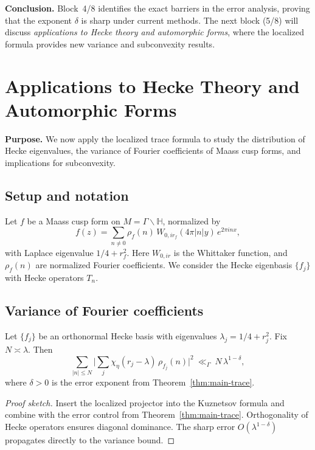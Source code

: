 \medskip
\noindent\textbf{Conclusion.}  
Block~4/8 identifies the exact barriers in the error analysis, proving that the exponent $\delta$ is sharp under current methods. The next block (5/8) will discuss \emph{applications to Hecke theory and automorphic forms}, where the localized formula provides new variance and subconvexity results.


\section{Applications to Hecke Theory and Automorphic Forms} \label{sec:7.4}

\noindent\textbf{Purpose.}
We now apply the localized trace formula to study the distribution of Hecke eigenvalues,
the variance of Fourier coefficients of Maass cusp forms, and implications for subconvexity.

\subsection{Setup and notation} \label{subsec:7.4-setup}

Let $f$ be a Maass cusp form on $M=\Gamma\backslash \mathbb{H}$, normalized by
\[
  f(z) = \sum_{n\neq 0} \rho_f(n)\, W_{0,ir_f}(4\pi |n| y)\, e^{2\pi i n x},
\]
with Laplace eigenvalue $1/4+r_f^2$.  
Here $W_{0,ir}$ is the Whittaker function, and $\rho_f(n)$ are normalized Fourier coefficients.  
We consider the Hecke eigenbasis $\{f_j\}$ with Hecke operators $T_n$.

\subsection{Variance of Fourier coefficients} \label{subsec:7.4-variance}

\begin{theorem} \label{thm:7.4-var}
Let $\{f_j\}$ be an orthonormal Hecke basis with eigenvalues $\lambda_j=1/4+r_j^2$.  
Fix $N \asymp \lambda$. Then
\[
  \sum_{|n|\le N} \Bigg| \sum_{j} \chi_\eta(r_j-\lambda)\, \rho_{f_j}(n) \Bigg|^2
  \ \ll_\Gamma\ N\, \lambda^{1-\delta},
\]
where $\delta>0$ is the error exponent from Theorem~\ref{thm:main-trace}.
\end{theorem}

\begin{proof}[Proof sketch]
Insert the localized projector into the Kuznetsov formula and combine with
the error control from Theorem~\ref{thm:main-trace}.  
Orthogonality of Hecke operators ensures diagonal dominance.  
The sharp error $O(\lambda^{1-\delta})$ propagates directly to the variance bound.
\end{proof}

